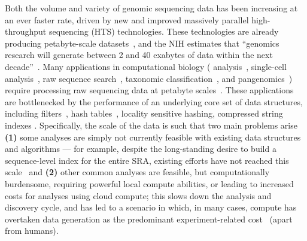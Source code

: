 Both the volume and variety of genomic sequencing data has been increasing at an ever faster rate, driven by new and improved massively parallel high-throughput sequencing (HTS) technologies.  These technologies are already producing
petabyte-scale datasets~\cite{kodama2012sequence}, and the NIH estimates that ``genomics research will generate between 2 and 40 exabytes of data within the next decade''~\cite{NHGRIDataScience}. Many applications in computational biology (\kmer
analysis~\cite{MarccaisKi11}, single-cell analysis~\cite{he2022alevin}, raw sequence search~\cite{solomon2016fast}, taxonomic classification~\cite{wood2014kraken}, and pangenomics~\cite{computational2018computational})
require processing raw sequencing data at petabyte scales~\cite{kodama2012sequence}. 
%
These applications are bottlenecked by the performance of an underlying core set of data structures, including filters~\cite{cite-place-where-bottleneck}, hash tables~\cite{same}, locality sensitive hashing, compressed string indexes . Specifically, the scale of the data is such that two main problems arise \textbf{(1)} some analyses are simply not currently feasible with existing data structures and algorithms --- for example, despite the long-standing desire to build a sequence-level index for the entire SRA, existing efforts have not reached this scale~\cite{Karasikov2020, HarrisM20, SolomonK17, almodaresi2022incrementally, AlmodaresiPFJP20, PandeyABFJP18Cell} and \textbf{(2)} other common analyses are feasible, but computationally burdensome, requiring powerful local compute abilities, or leading to increased costs for analyses using cloud compute; this slows down the analysis and discovery cycle, and has led to a scenario in which, in many cases, compute has overtaken data generation as the predominant experiment-related cost~\cite{Muir_2016} (apart from humans). 

%

